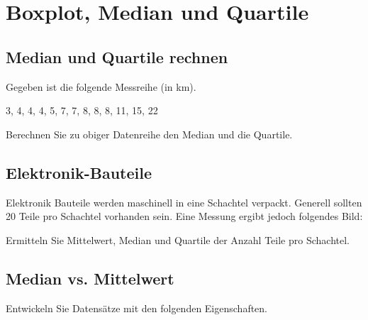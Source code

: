 
\section{Boxplot, Median und Quartile}

\subsection{Median und Quartile rechnen}

Gegeben ist die folgende Messreihe (in km).

3, 4, 4, 4, 5, 7, 7, 8, 8, 8, 11, 15, 22

Berechnen Sie zu obiger Datenreihe den Median und die Quartile.



\subsection{Elektronik-Bauteile}
Elektronik Bauteile werden maschinell in eine Schachtel verpackt.
Generell sollten 20 Teile pro Schachtel vorhanden sein. Eine Messung ergibt 
jedoch folgendes Bild:


Ermitteln Sie Mittelwert, Median und Quartile der Anzahl Teile pro Schachtel.


\subsection{Median vs. Mittelwert}
Entwickeln Sie Datensätze mit den folgenden Eigenschaften.

